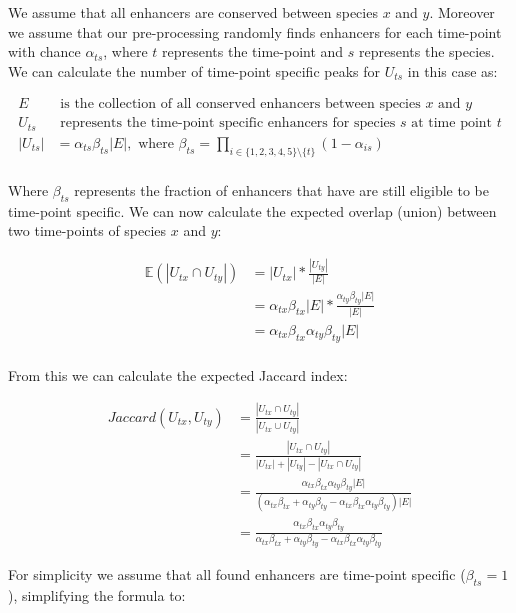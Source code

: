 We assume that all enhancers are conserved between species $x$ and $y$. Moreover we assume that our pre-processing randomly finds enhancers for each time-point with chance $\alpha_{ts}$, where $t$ represents the time-point and $s$ represents the species. We can calculate the number of time-point specific peaks for $U_{ts}$ in this case as:

\begin{align*}
    E & \text{ is the collection of all conserved enhancers between species } x \text{ and } y \\
    U_{ts} & \text{ represents the time-point specific enhancers for species } s \text{ at time point } t \\
    |U_{ts}| & = \alpha_{ts} \beta_{ts} |E|, \text{ where } \beta_{ts} = \prod_{i \in \{1, 2, 3, 4, 5\}\setminus\{t\}} (1 - \alpha_{is}) \\
\end{align*}

Where $\beta_{ts}$ represents the fraction of enhancers that have are still eligible to be time-point specific. We can now calculate the expected overlap (union) between two time-points of species $x$ and $y$:

\begin{align*}
    \mathbb{E}(|U_{tx} \cap U_{ty}|) & = |U_{tx}| * \frac{|U_{ty}|}{|E|} \\
    & = \alpha_{tx} \beta_{tx} |E| * \frac{\alpha_{ty} \beta_{ty} |E|}{|E|} \\
    & = \alpha_{tx} \beta_{tx} \alpha_{ty} \beta_{ty} |E| \\
\end{align*}

From this we can calculate the expected Jaccard index:

\begin{align*}
    Jaccard(U_{tx}, U_{ty}) & = \frac{|U_{tx} \cap U_{ty}|}{|U_{tx} \cup U_{ty}|} \\
    & = \frac{|U_{tx} \cap U_{ty}|}{|U_{tx}| + |U_{ty}| - |U_{tx} \cap U_{ty}|} \\
    & = \frac{\alpha_{tx} \beta_{tx} \alpha_{ty} \beta_{ty} |E|}{(\alpha_{tx} \beta_{tx} + \alpha_{ty} \beta_{ty} - \alpha_{tx} \beta_{tx} \alpha_{ty} \beta_{ty})|E|} \\
    & = \frac{\alpha_{tx} \beta_{tx} \alpha_{ty} \beta_{ty}}{\alpha_{tx} \beta_{tx} + \alpha_{ty} \beta_{ty} - \alpha_{tx} \beta_{tx} \alpha_{ty} \beta_{ty}}
\end{align*}

For simplicity we assume that all found enhancers are time-point specific ($\beta_{ts} = 1$), simplifying the formula to:

